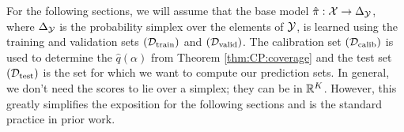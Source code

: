 %
For the following sections, we will assume that the base model $\hat{\pi}: {\mathcal{X}} \to \Delta_{{\mathcal{Y}}}$, where $\Delta_{{\mathcal{Y}}}$ is the probability simplex over the elements of ${\mathcal{Y}}$, is learned using the training and validation sets $({\mathcal{D}}_{\text{train}})$ and $({\mathcal{D}}_{\text{valid}})$. 
The calibration set $({\mathcal{D}}_{\text{calib}})$ is used to determine the $\hat{q}(\alpha)$ from Theorem \ref{thm:CP:coverage} and the test set $({\mathcal{D}}_{\text{test}})$ is the set for which we want to compute our prediction sets.
In general, we don't need the scores to lie over a simplex; they can be in $\mathbb{R}^K$.
However, this greatly simplifies the exposition for the following sections and is the standard practice in prior work.

